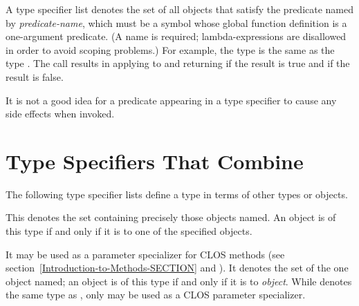 A type specifier list  denotes
the set of all objects that satisfy the predicate named by \emph{predicate-name},
which must be a symbol whose global function definition is a one-argument
predicate.
(A name is required; lambda-expressions are disallowed in order to avoid
scoping problems.)  For example, the type  is the
same as the type .
The call  results in applying  to 
and returning  if the result is true and {\nil} if the result is false.

It is not a good idea for
a predicate appearing in a  type specifier to
cause any side effects when invoked.

\section{Type Specifiers That Combine}

The following type specifier lists define a type in terms of
other types or objects.

\begin{flushdesc}
\item[\cd{(member \emph{object1} \emph{object2} ...)}]
This denotes the set
containing precisely those objects named.  An object is of
this type if and only if it is  to one of the specified objects.
\end{flushdesc}

\begin{flushdesc}
\item[\cd{(eql \emph{object})}]
It may be used as a parameter specializer for CLOS methods
(see section~\ref{Introduction-to-Methods-SECTION}
and ).
It denotes the set of the one object named;  an object is of
this type if and only if it is  to \emph{object}.  While
 denotes the same type as ,
only  may be used as a CLOS parameter specializer.
\end{flushdesc}


